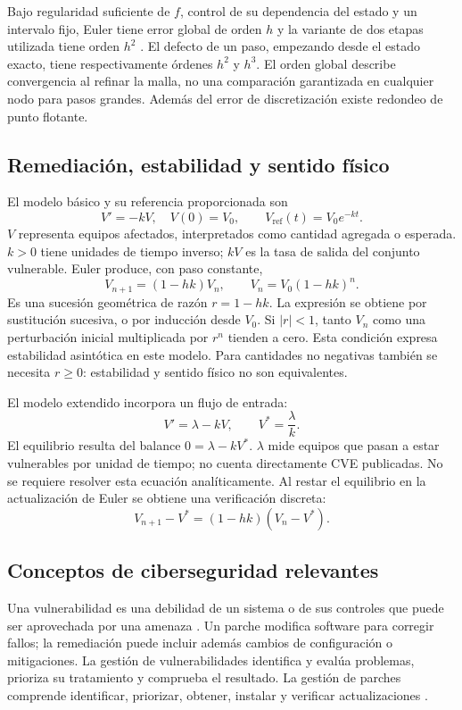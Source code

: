 \documentclass[11pt,a4paper]{article}
\begin{document}
Bajo regularidad suficiente de $f$, control de su dependencia del estado y un intervalo fijo, Euler tiene error global de orden $h$ y la variante de dos etapas utilizada tiene orden $h^2$ \parencite{euler,rk}. El defecto de un paso, empezando desde el estado exacto, tiene respectivamente órdenes $h^2$ y $h^3$. El orden global describe convergencia al refinar la malla, no una comparación garantizada en cualquier nodo para pasos grandes. Además del error de discretización existe redondeo de punto flotante.

\subsection{Remediación, estabilidad y sentido físico}
El modelo básico y su referencia proporcionada son
\begin{equation}\label{eq:basico}
V'=-kV,\quad V(0)=V_0,\qquad V_{\mathrm{ref}}(t)=V_0e^{-kt}.
\end{equation}
$V$ representa equipos afectados, interpretados como cantidad agregada o esperada. $k>0$ tiene unidades de tiempo inverso; $kV$ es la tasa de salida del conjunto vulnerable. Euler produce, con paso constante,
\begin{equation}\label{eq:geometrica}
V_{n+1}=(1-hk)V_n,\qquad V_n=V_0(1-hk)^n.
\end{equation}
Es una sucesión geométrica de razón $r=1-hk$. La expresión se obtiene por sustitución sucesiva, o por inducción desde $V_0$. Si $|r|<1$, tanto $V_n$ como una perturbación inicial multiplicada por $r^n$ tienden a cero. Esta condición expresa estabilidad asintótica en este modelo. Para cantidades no negativas también se necesita $r\ge0$: estabilidad y sentido físico no son equivalentes.

El modelo extendido incorpora un flujo de entrada:
\begin{equation}\label{eq:extendido}
V'=\lambda-kV,\qquad V^*=\frac{\lambda}{k}.
\end{equation}
El equilibrio resulta del balance $0=\lambda-kV^*$. $\lambda$ mide equipos que pasan a estar vulnerables por unidad de tiempo; no cuenta directamente CVE publicadas. No se requiere resolver esta ecuación analíticamente. Al restar el equilibrio en la actualización de Euler se obtiene una verificación discreta:
\begin{equation}\label{eq:desviacion}
V_{n+1}-V^*=(1-hk)(V_n-V^*).
\end{equation}

\subsection{Conceptos de ciberseguridad relevantes}
Una vulnerabilidad es una debilidad de un sistema o de sus controles que puede ser aprovechada por una amenaza \parencite{vulnerabilidad}. Un parche modifica software para corregir fallos; la remediación puede incluir además cambios de configuración o mitigaciones. La gestión de vulnerabilidades identifica y evalúa problemas, prioriza su tratamiento y comprueba el resultado. La gestión de parches comprende identificar, priorizar, obtener, instalar y verificar actualizaciones \parencite{nist}.
\end{document}
